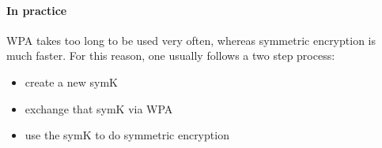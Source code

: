 \paragraph{In practice} WPA takes too long to be used very often, whereas symmetric encryption is much faster. For this reason, one usually follows a two step process:
\begin{itemize}
	\item create a new symK
	\item exchange that symK via WPA
	\item use the symK to do symmetric encryption
\end{itemize}

